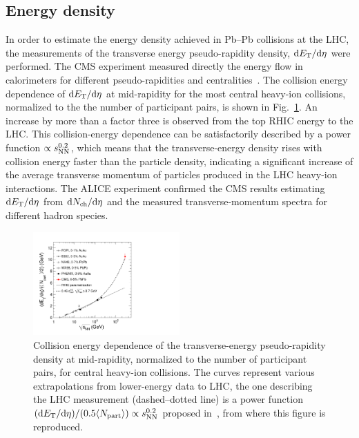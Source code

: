 \subsection{Energy density}
\label{subsecks:energydensity}

In order to estimate the energy density achieved in Pb--Pb collisions at the LHC, the measurements of the transverse energy pseudo-rapidity density, ${\rm d}E_{\rm T}/{\rm d}\eta$ were performed. The CMS experiment measured directly the energy flow in calorimeters for different pseudo-rapidities and centralities~\cite{Chatrchyan:2012mb}. The collision energy dependence of ${\rm d}E_{\rm T}/{\rm d}\eta$ at mid-rapidity for the most central heavy-ion collisions, normalized to the the number of participant pairs, is shown in Fig.~\ref{figks:ETvsEnerg}. An increase by more than a factor three is observed from the top RHIC energy to the LHC. This collision-energy dependence can be satisfactorily described by a power function $\propto s_{\rm NN}^{0.2}$, which means that the transverse-energy density rises with collision energy faster than the particle density, indicating a significant increase of the average transverse momentum of particles produced in the LHC heavy-ion interactions. The ALICE experiment confirmed the CMS results estimating ${\rm d}E_{\rm T}/{\rm d}\eta$ from ${\rm d}N_{\rm ch}/{\rm d}\eta$ and the measured transverse-momentum spectra for different hadron species.

\begin{figure}
\centering
\includegraphics[width=0.5\textwidth]{ksfigures/CMSETvsEnerg.pdf}
\caption{Collision energy dependence of the transverse-energy pseudo-rapidity density at mid-rapidity, normalized to the number of participant pairs, for central heavy-ion collisions. The curves represent various extrapolations from lower-energy data to LHC, the one describing the LHC measurement (dashed--dotted line) is a power function $({\rm d}E_{\rm T}/{\rm d}\eta)/(0.5 \langle N_{\rm part} \rangle) \propto s_{\rm NN}^{0.2}$ proposed in~\cite{Chatrchyan:2012mb}, from where this figure is reproduced.}
\label{figks:ETvsEnerg}
\end{figure}

